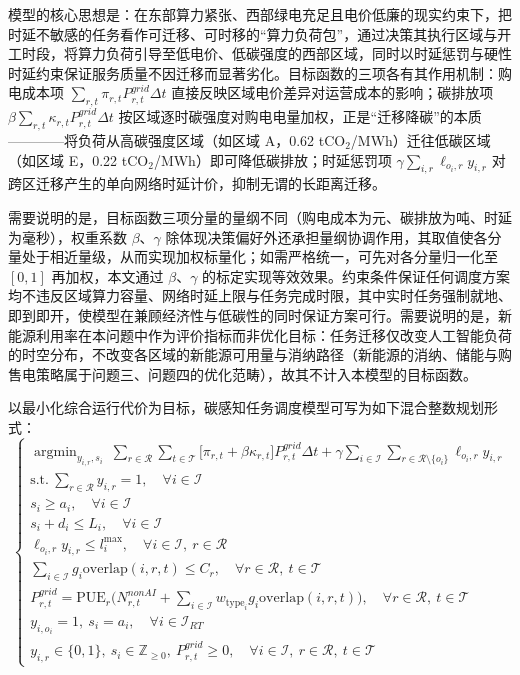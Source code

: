 \documentclass{ctexart}
\DeclareMathOperator*{\argmin}{argmin}
\begin{document}
模型的核心思想是：在东部算力紧张、西部绿电充足且电价低廉的现实约束下，把时延不敏感的任务看作可迁移、可时移的“算力负荷包”，通过决策其执行区域与开工时段，将算力负荷引导至低电价、低碳强度的西部区域，同时以时延惩罚与硬性时延约束保证服务质量不因迁移而显著劣化。目标函数的三项各有其作用机制：购电成本项 $\sum_{r,t}\pi_{r,t}P^{grid}_{r,t}\Delta t$ 直接反映区域电价差异对运营成本的影响；碳排放项 $\beta\sum_{r,t}\kappa_{r,t}P^{grid}_{r,t}\Delta t$ 按区域逐时碳强度对购电电量加权，正是“迁移降碳”的本质————将负荷从高碳强度区域（如区域 A，0.62 tCO$_2$/MWh）迁往低碳区域（如区域 E，0.22 tCO$_2$/MWh）即可降低碳排放；时延惩罚项 $\gamma\sum_{i,r}\ell_{o_i,r}y_{i,r}$ 对跨区迁移产生的单向网络时延计价，抑制无谓的长距离迁移。

需要说明的是，目标函数三项分量的量纲不同（购电成本为元、碳排放为吨、时延为毫秒），权重系数 $\beta$、$\gamma$ 除体现决策偏好外还承担量纲协调作用，其取值使各分量处于相近量级，从而实现加权标量化；如需严格统一，可先对各分量归一化至 $[0,1]$ 再加权，本文通过 $\beta$、$\gamma$ 的标定实现等效效果。约束条件保证任何调度方案均不违反区域算力容量、网络时延上限与任务完成时限，其中实时任务强制就地、即到即开，使模型在兼顾经济性与低碳性的同时保证方案可行。需要说明的是，新能源利用率在本问题中作为评价指标而非优化目标：任务迁移仅改变人工智能负荷的时空分布，不改变各区域的新能源可用量与消纳路径（新能源的消纳、储能与购售电策略属于问题三、问题四的优化范畴），故其不计入本模型的目标函数。

以最小化综合运行代价为目标，碳感知任务调度模型可写为如下混合整数规划形式：
\begin{equation}
\begin{cases}
\displaystyle\argmin_{y_{i,r},s_i}\ \sum_{r\in\mathcal{R}}\sum_{t\in\mathcal{T}}\big[\pi_{r,t}+\beta\kappa_{r,t}\big]P^{grid}_{r,t}\Delta t + \gamma\sum_{i\in\mathcal{I}}\sum_{r\in\mathcal{R}\setminus\{o_i\}}\ell_{o_i,r}y_{i,r}\\\text{s.t.}\ \sum_{r\in\mathcal{R}}y_{i,r}=1,\quad \forall i\in\mathcal{I}\\s_i\ge a_i,\quad \forall i\in\mathcal{I}\\s_i+d_i\le L_i,\quad \forall i\in\mathcal{I}\\\ell_{o_i,r}y_{i,r}\le l_i^{\max},\quad \forall i\in\mathcal{I},\ r\in\mathcal{R}\\\sum_{i\in\mathcal{I}}g_i\mathrm{overlap}(i,r,t)\le C_r,\quad \forall r\in\mathcal{R},\ t\in\mathcal{T}\\P^{grid}_{r,t}=\mathrm{PUE}_r\Big(N^{nonAI}_{r,t}+\sum_{i\in\mathcal{I}}w_{\mathrm{type}_i}g_i\mathrm{overlap}(i,r,t)\Big),\quad \forall r\in\mathcal{R},\ t\in\mathcal{T}\\y_{i,o_i}=1,\ s_i=a_i,\quad \forall i\in\mathcal{I}_{RT}\\y_{i,r}\in\{0,1\},\ s_i\in\mathbb{Z}_{\ge 0},\ P^{grid}_{r,t}\ge 0,\quad \forall i\in\mathcal{I},\ r\in\mathcal{R},\ t\in\mathcal{T}
\end{cases}
\end{equation}
\end{document}
